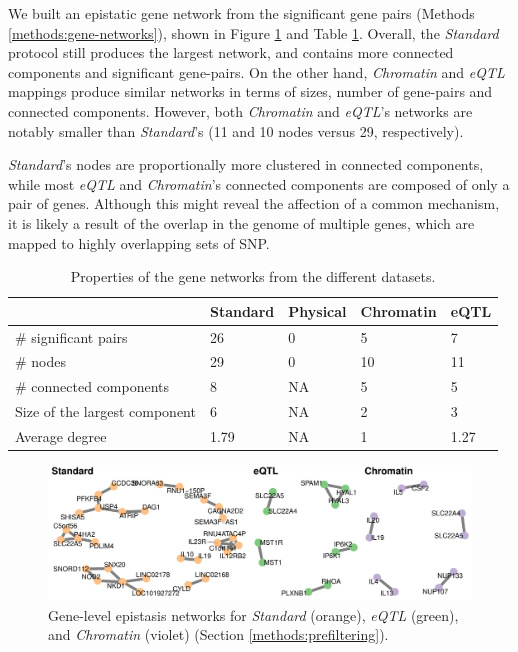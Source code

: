 \documentclass[
  11pt,
]{env/yjiao}
\begin{document}
We built an epistatic gene network from the significant gene pairs
(Methods \ref{methods:gene-networks}), shown in Figure \ref{fig:gene-networks}
and Table \ref{tab:gene-networks-stats}. Overall, the \emph{Standard} protocol still
produces the largest network, and contains more connected components and
significant gene-pairs. On the other hand, \emph{Chromatin} and \emph{eQTL} mappings
produce similar networks in terms of sizes, number of gene-pairs and
connected components. However, both \emph{Chromatin} and \emph{eQTL}'s networks are
notably smaller than \emph{Standard}'s (11 and 10 nodes versus 29,
respectively).

\emph{Standard}'s nodes are proportionally more clustered in
connected components, while most \emph{eQTL} and \emph{Chromatin}'s connected
components are composed of only a pair of genes. Although this might
reveal the affection of a common mechanism, it is likely a result of the
overlap in the genome of multiple genes, which are mapped to highly
overlapping sets of SNP.

\begin{table}

\caption{\label{tab:gene-networks-stats}Properties of the gene networks from the different datasets.}
\centering
\begin{tabular}[t]{lllll}
\toprule
 & Standard & Physical & Chromatin & eQTL\\
\midrule
\rowcolor{gray!6}  \# significant pairs & 26 & 0 & 5 & 7\\
\# nodes & 29 & 0 & 10 & 11\\
\rowcolor{gray!6}  \# connected components & 8 & NA & 5 & 5\\
Size of the largest component & 6 & NA & 2 & 3\\
\rowcolor{gray!6}  Average degree & 1.79 & NA & 1 & 1.27\\
\bottomrule
\end{tabular}
\end{table}



\begin{figure}
\centering
\includegraphics{fig/gene_networks.pdf}
\caption{\label{fig:gene-networks}Gene-level epistasis networks for \emph{Standard} (orange), \emph{eQTL} (green), and \emph{Chromatin} (violet) (Section \ref{methods:prefiltering}).}
\end{figure}
\end{document}
